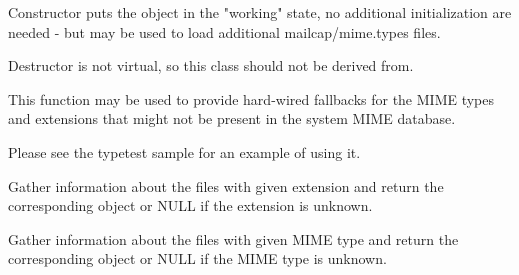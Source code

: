 
\label{wxmimetypesmanagerctor}


Constructor puts the object in the "working" state, no additional initialization
are needed - but  may be used to load
additional mailcap/mime.types files.

\label{wxmimetypesmanagerdtor}


Destructor is not virtual, so this class should not be derived from.

\label{wxmimetypesmanageraddfallbacks}


This function may be used to provide hard-wired fallbacks for the MIME types
and extensions that might not be present in the system MIME database.


Please see the typetest sample for an example of using it.

\label{wxmimetypesmanagergetfiletypefromextension}


Gather information about the files with given extension and return the
corresponding  object or NULL if the extension
is unknown.

\label{wxmimetypesmanagergetfiletypefrommimetype}


Gather information about the files with given MIME type and return the
corresponding  object or NULL if the MIME type
is unknown.

\label{wxmimetypesmanagerisoftype}

